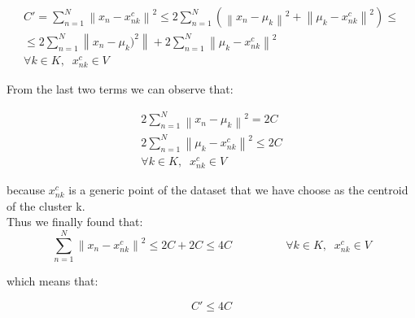 \documentclass{article}
\newcommand{\norm}[1]{\left\lVert#1\right\rVert}
\begin{document}
\begin{equation} \label{eq:kmedoid_cost3}
\begin{split}
C' = \sum_{n=1}^{N} \norm{x_{n} - x_{nk}^{c} }^2	  \leq 	2 \sum_{n=1}^{N}  ( \norm{x_{n} - \mu_{k}}^2 + \norm{\mu_{k} - x_{nk}^{c}}^2 ) 	\leq	\\
\leq 	2 \sum_{n=1}^{N}  \norm{ x_{n} - \mu_{k})^2 } 	+ 	2 \sum_{n=1}^{N}  \norm { \mu_{k} - x_{nk}^{c} }^2	\\
\forall k \in K, \;\;  x_{nk}^{c} \in V   
\end{split}
\end{equation}

From the last two terms we can observe that:

\begin{equation} \label{eq:kmedoid_cost4}
\begin{split}
2 \sum_{n=1}^{N}  \norm { x_{n} - \mu_{k} }^2  = 2C	\\	
2 \sum_{n=1}^{N}  \norm { \mu_{k} - x_{nk}^{c} }^2	\leq 2C  \\
\forall k \in K, \;\;  x_{nk}^{c} \in V   
\end{split}
\end{equation}

because $x_{nk}^{c}$ is a generic point of the dataset that we have choose as the centroid of the cluster k. \\

Thus we finally found that:
\begin{equation} \label{theEnd1}
\sum_{n=1}^{N} \norm{x_{n} - x_{nk}^{c} }^2 \leq 2C + 2C \leq 4C         \;\;\;\;\;\;\;\;\;\;\;\;\;\;\;\;\;     \forall k \in K, \;\;  x_{nk}^{c} \in V
\end{equation}

which means that:

\begin{equation} \label{theEnd2}
C' \leq 4C
\end{equation}
\end{document}
